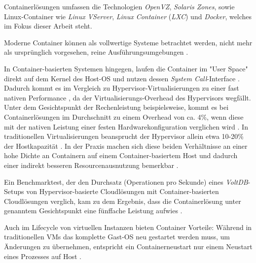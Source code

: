\documentclass[../main.tex]{subfiles}
\begin{document}

      Containerlösungen umfassen die Technologien \emph{OpenVZ}, \emph{Solaris Zones}, sowie Linux-Container wie \emph{Linux VServer}, \emph{Linux Container} (\emph{LXC}) \cite[S.7]{dockerBook}\cite[S.1]{containerVirtPerformance} und \emph{Docker}, welches im Fokus dieser Arbeit steht.

      Moderne Container können als vollwertige Systeme betrachtet werden, nicht mehr als ursprünglich vorgesehen, reine Ausführungsumgebungen \cite[S.7]{dockerBook}.

      In Container-basierten Systemen hingegen, laufen die Container im "User Space" direkt auf dem Kernel des Host-OS und nutzen dessen \emph{System Call}-Interface \cite[S.6+7]{dockerBook}. Dadurch kommt es im Vergleich zu Hypervisor-Virtualisierungen zu einer fast nativen Performance \cite[S.1]{containerVirtPerformance}, da der Virtualisierungs-Overhead des Hypervisors wegfällt. Unter dem Gesichtspunkt der Rechenleistung beispielsweise, kommt es bei Containerlösungen im Durchschnitt zu einem Overhead von ca. 4\%, wenn diese mit der nativen Leistung einer festen Hardwarekonfiguration verglichen wird \cite[S.4]{containerVirtPerformance}\cite[S.5]{IBMcontVMcomparison}. In traditionellen Virtualisierungen beansprucht der Hypervisor allein etwa 10-20\% der Hostkapazität \cite[S.2]{dockerIntroIEEE}\cite[S.5]{IBMcontVMcomparison}. In der Praxis machen sich diese beiden Verhältnisse an einer hohe Dichte an Containern auf einem Container-basiertem Host und dadurch einer indirekt besseren Resourcenausnutzung bemerkbar \cite[S.7+8]{dockerBook}.

      Ein Benchmarktest, der den Durchsatz (Operationen pro Sekunde) eines \emph{VoltDB}-Setups von Hypervisor-basierte Cloudlösungen mit Container-basierten Cloudlösungen verglich, kam zu dem Ergebnis, dass die Containerlösung unter genanntem Gesichtspunkt eine fünffache Leistung aufwies \cite[S.2+3]{voltdb}.

      Auch im Lifecycle von virtuellen Instanzen bieten Container Vorteile: Während in traditionellen VMs das komplette Gast-OS neu gestartet werden muss, um Änderungen zu übernehmen, entspricht ein Containerneustart nur einem Neustart eines Prozesses auf Host \cite[S.2]{dockerLXCKub}.
\end{document}
